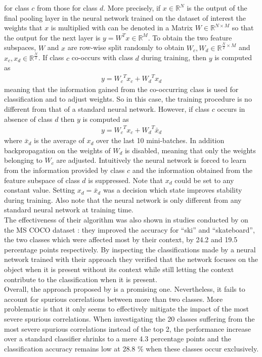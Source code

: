 \documentclass{article}
\begin{document}
for class $c$ from those for class $d$. More precisely, if $x \in \mathbb{R}^N$ is the output of the final pooling layer
in the neural network trained on the dataset of interest the weights that $x$ is multiplied with can be denoted in a Matrix
$W \in \mathbb{R}^{N \times M}$ so that the output for the next layer is $y=W^Tx \in \mathbb{R}^M$. To obtain the two
feature subspaces, $W$ and $x$ are row-wise split randomly to obtain $W_c,W_d \in \mathbb{R}^{\frac{N}{2} \times M}$
and $x_c, x_d \in \mathbb{R}^{\frac{N}{2}}$. If class $c$ co-occurs with class $d$ during training, then $y$ is computed as 
\begin{align*}
    y={W_c}^T x_c + {W_d}^T x_d
\end{align*}
meaning that the information gained from the co-occurring class is used for classification
and to adjust weights. So in this case, the training procedure is no different from that of a standard neural network.
However, if class $c$ occurs in absence of class $d$ then $y$ is computed as 
\begin{align*}
    y={W_c}^T x_c + {W_d}^T \bar{x}_d
\end{align*}
where $\bar{x}_d$ is the average of $x_d$ over the last 10 mini-batches. In addition backpropagation on the weights of $W_d$
is disabled, meaning that only the weights belonging to $W_c$ are adjusted. Intuitively the neural network is forced to
learn from the information provided by class $c$ and the information obtained from the feature subspace of class $d$ is suppressed.
Note that $x_d$ could be set to any constant value. Setting $x_d = \bar{x}_d$ was a decision which \cite{Singh_2020_CVPR} state improves
stability during training. Also note that the neural network is only different from any standard neural network at training time. \\
The effectiveness of their algorithm was also shown in studies conducted by \cite{Singh_2020_CVPR} on the MS COCO dataset \cite{lin2015microsoft}:
they improved the accuracy for \enquote{ski} and \enquote{skateboard}, the two classes which were affected most by their context,
by 24.2 and 19.5 percentage points respectively. By inspecting the classifications made by a neural network trained with their
approach they verified that the network focuses on the object when it is present without its context while still letting the context contribute to the classification when it is present. \\
Overall, the approach proposed by \cite{Singh_2020_CVPR} is a promising one. Nevertheless, it fails to account for spurious correlations between
more than two classes. More problematic is that it only seems to effectively mitigate the impact of the most severe spurious correlations.
When investigating the 20 classes suffering from the most severe spurious correlations instead of the top 2, the performance increase
over a standard classifier shrinks to a mere 4.3 percentage points and the classification accuracy remains low at 28.8 \% when these
classes occur exclusively.
\end{document}
